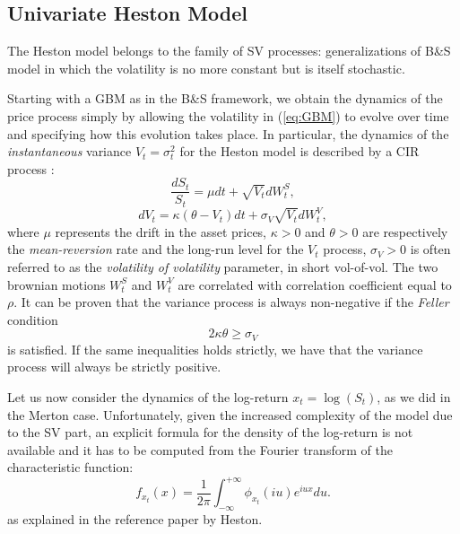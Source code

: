 \subsection{Univariate Heston Model}
The Heston model belongs to the family of SV processes: generalizations of B\&S model in which the volatility is no more constant but is itself  stochastic.

Starting with a GBM as in the B\&S framework, we obtain the dynamics of the price process simply by allowing the volatility in (\ref{eq:GBM}) to evolve over time and specifying how this evolution takes place.
In particular, the dynamics of the \textit{instantaneous} variance $V_t = \sigma_t^2$ for the Heston model is described by a CIR process :
\begin{equation}
\label{eq:heston_price}
	\frac{dS_t}{S_t} = \mu dt +\sqrt{ V_t} dW_t^S,
\end{equation}
\begin{equation}
\label{eq:heston_variance}
	dV_t = \kappa (\theta - V_t) dt + \sigma_V \sqrt{V_t} dW_t^V,
\end{equation}
\noindent
where $\mu$ represents the drift in the asset prices, $\kappa>0$ and $\theta>0$ are respectively the \textit{mean-reversion} rate  and the long-run level for the $V_t$ process, $\sigma_V>0$ is often referred to as the \textit{volatility of volatility} parameter, in short vol-of-vol.
The two brownian motions $W_t^S$ and $W_t^V$ are correlated with correlation coefficient equal to $\rho$.
It can be proven that the variance process is always non-negative if the \textit{Feller} condition
 \begin{equation}
 \label{eq:feller_condition}
	2\kappa\theta \geq \sigma_V
 \end{equation} 
 is satisfied. If the same inequalities holds strictly, we have that the variance process will always be strictly positive.

Let us now consider the dynamics of the log-return $x_t = \log (S_t)$, as we did in the Merton case. 
Unfortunately, given the increased complexity of the model due to the SV part, an explicit formula for the density of the log-return is not available and it has to be computed from the Fourier transform of the characteristic function:
\begin{equation}
\label{eq:chf_inversion}
f_{x_t}(x) = \frac{1}{2\pi}\int_{-\infty}^{+\infty} \phi_{x_t}(i u) e^{i u x} du .
\end{equation}
\noindent
as explained in the reference paper by Heston.

